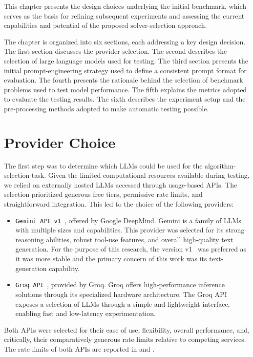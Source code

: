 \documentclass[../../main]{subfiles}
\begin{document}
This chapter presents the design choices underlying the initial benchmark, which serves as the basis for refining subsequent experiments and assessing the current capabilities and potential of the proposed solver-selection approach.

The chapter is organized into six sections, each addressing a key design decision. The first section discusses the provider selection. The second describes the selection of large language models used for testing. The third section presents the initial prompt-engineering strategy used to define a consistent prompt format for evaluation. The fourth presents the rationale behind the selection of benchmark problems used to test model performance. The fifth explains the metrics adopted to evaluate the testing results. The sixth describes the experiment setup and the pre-processing methods adopted to make automatic testing possible.



\section{Provider Choice}
The first step was to determine which LLMs could be used for the algorithm-selection task. Given the limited computational resources available during testing, we relied on externally hosted LLMs accessed through usage-based APIs. The selection prioritized generous free tiers, permissive rate limits, and straightforward integration. This led to the choice of the following providers:
\begin{itemize}
    \item \texttt{Gemini API v1}~\cite{GeminiAPI}, offered by Google DeepMind. Gemini is a family of LLMs with multiple sizes and capabilities. This provider was selected for its strong reasoning abilities, robust tool-use features, and overall high-quality text generation. For the purpose of this research, the version v1~\cite{GeminiAPIver} was preferred as it was more stable and the primary concern of this work was its text-generation capability.

    \item \texttt{Groq API}~\cite{GroqAPI}, provided by Groq. Groq offers
    high-performance inference solutions through its specialized hardware
    architecture. The Groq API exposes a selection of LLMs through a simple and
    lightweight interface, enabling fast and low-latency experimentation.
\end{itemize}

Both APIs were selected for their ease of use, flexibility, overall performance, and, critically, their comparatively generous rate limits relative to competing services. The rate limits of both APIs are reported in  and . 
\end{document}
